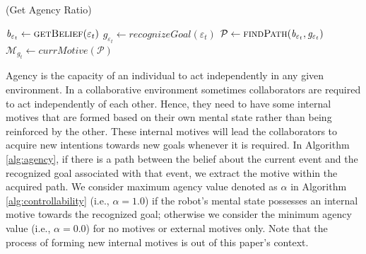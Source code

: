 \documentclass[letterpaper]{article}
\begin{document}
\renewcommand\thealgorithm{4\alph{algorithm}}
\setcounter{algorithm}{0}

\begin{algorithm}
	\caption{(Get Agency Ratio)}
	\label{alg:agency}
	\begin{algorithmic}[1]
			\Statex
			\State $\mathit{b}_{\varepsilon_t} \gets \Call{getBelief}{\varepsilon_t}$
			\State $\mathit{g}_{\varepsilon_t} \gets
			\textit{recognizeGoal}{(\varepsilon_t)}$
			\Statex
				\State {}
			\EndIf
			\Statex
			\State $\mathcal{P} \gets \Call{findPath}{\mathit{b}_{\varepsilon_t},
			\mathit{g}_{\varepsilon_t}}$
			\Statex
				\State
				\State $\mathcal{M}_{\mathit{g}_{t}} \gets
				\textit{currMotive}{(\mathcal{P})}$
				\Statex
					 \State {}
					\Else
						\State {}
					\EndIf
				\Else
					\State {}
				\EndIf
			\Else
				\State {}
			\EndIf
		\EndFunction 
	\end{algorithmic}
\end{algorithm}

Agency is the capacity of an individual to act independently in any given
environment. In a collaborative environment sometimes collaborators are required
to act independently of each other. Hence, they need to have some internal motives
that are formed based on their own mental state rather than being reinforced by
the other. These internal motives will lead the collaborators to acquire new
intentions towards new goals whenever it is required. In Algorithm
\ref{alg:agency}, if there is a path between the belief about the current event
and the recognized goal associated with that event, we extract the motive within
the acquired path. We consider maximum agency value denoted as $\alpha$ in
Algorithm \ref{alg:controllability} (i.e., $\alpha=1.0$) if the robot's mental
state possesses an internal motive towards the recognized goal; otherwise we
consider the minimum agency value (i.e., $\alpha=0.0$) for no motives or
external motives only. Note that the process of forming new internal motives is
out of this paper's context.
\end{document}
